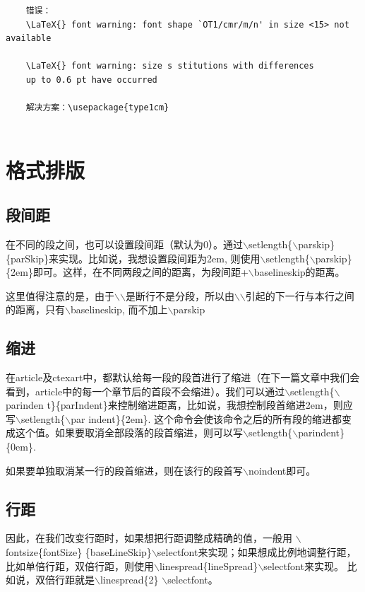 \documentclass[12pt]{book}
\begin{document}
\begin{verbatim}
    错误：
    \LaTeX{} font warning: font shape `OT1/cmr/m/n' in size <15> not available
    
    \LaTeX{} font warning: size s stitutions with differences
    up to 0.6 pt have occurred
    
    解决方案：\usepackage{type1cm}
    
\end{verbatim}

\chapter{格式排版}

\section{段间距}

在不同的段之间，也可以设置段间距（默认为0）。通过$\backslash$setlength\{$\backslash$parskip\}\{parSkip\}来实现。比如说，我想设置段间距为2em, 则使用$\backslash$setlength\{$\backslash$parskip\}\{2em\}即可。这样，在不同两段之间的距离，为段间距+$\backslash$baselineskip的距离。

这里值得注意的是，由于$\backslash$$\backslash$是断行不是分段，所以由$\backslash$$\backslash$引起的下一行与本行之间的距离，只有$\backslash$baselineskip, 而不加上$\backslash$parskip

\section{缩进}

在article及ctexart中，都默认给每一段的段首进行了缩进（在下一篇文章中我们会看到，article中的每一个章节后的首段不会缩进）。我们可以通过$\backslash$setlength\{$\backslash$parinden t\}\{parIndent\}来控制缩进距离，比如说，我想控制段首缩进2em，则应写$\backslash$setlength\{$\backslash$par indent\}\{2em\}. 这个命令会使该命令之后的所有段的缩进都变成这个值。如果要取消全部段落的段首缩进，则可以写$\backslash$setlength\{$\backslash$parindent\}\{0em\}.

如果要单独取消某一行的段首缩进，则在该行的段首写$\backslash$noindent即可。

\section{行距}

因此，在我们改变行距时，如果想把行距调整成精确的值，一般用 $\backslash$fontsize\{fontSize\} \{baseLineSkip\}$\backslash$selectfont来实现；如果想成比例地调整行距，比如单倍行距，双倍行距，则使用$\backslash$linespread\{lineSpread\}$\backslash$selectfont来实现。 比如说，双倍行距就是$\backslash$linespread\{2\} $\backslash$selectfont。
\end{document}
